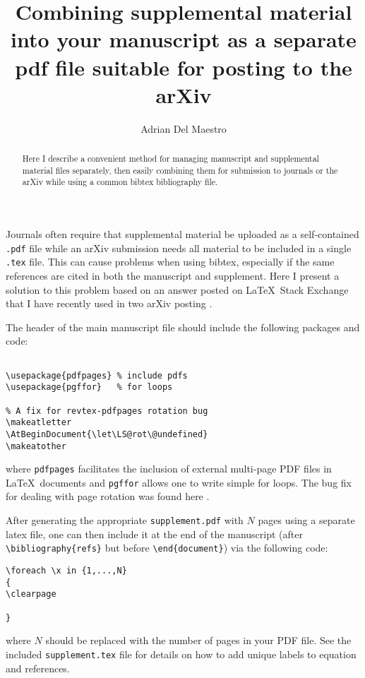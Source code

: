 \documentclass[10pt,twocolumn,prl,aps,floatfix,superscriptaddress,longbibliography]{revtex4-1}
\begin{document}
\title{Combining supplemental material into your manuscript as a separate pdf
file suitable for posting to the arXiv}

\author{Adrian Del Maestro}

\begin{abstract}
    Here I describe a convenient method for managing manuscript and supplemental
    material files separately, then easily combining them for submission to
    journals or the arXiv while using a common bibtex bibliography file.
\end{abstract}
\maketitle

Journals often require that supplemental material be uploaded as a
self-contained \texttt{.pdf} file while an arXiv submission needs all material to be
included in a single \texttt{.tex} file.  This can cause problems when using
bibtex, especially if the same references are cited in both the manuscript and supplement.
Here I present a solution to this problem based on an answer posted on
\LaTeX~Stack Exchange \cite{tex} that I have recently used in two arXiv
posting \cite{Sengupta:2017tl, Barghathi:2018rg}.

The header of the main manuscript file should include the following packages
and code:
%
\begin{verbatim}

\usepackage{pdfpages} % include pdfs
\usepackage{pgffor}   % for loops

% A fix for revtex-pdfpages rotation bug 
\makeatletter
\AtBeginDocument{\let\LS@rot\@undefined}
\makeatother
\end{verbatim}
%
where \texttt{pdfpages} facilitates the inclusion of external multi-page PDF
files in \LaTeX~documents \cite{pdfpages} and \texttt{pgffor} allows one
to write simple for loops.  The bug fix for dealing with page rotation was
found here \cite{rotate}.

After generating the appropriate \texttt{supplement.pdf} with $N$ pages using a
separate latex file, one can then include it at the end of the manuscript
(after \texttt{\textbackslash bibliography\{refs\}} but before \texttt{\textbackslash end\{document\}}) via the
following code:
%
\begin{verbatim}
\foreach \x in {1,...,N} 
{
\clearpage

}
\end{verbatim}
%
where $N$ should be replaced with the number of pages in your PDF file.   See
the included \texttt{supplement.tex} file for details on how to add unique
labels to equation and references.
\end{document}
